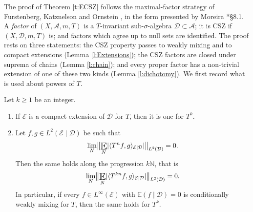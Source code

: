 The proof of Theorem \ref{t:ECSZ} follows the maximal-factor strategy of Furstenberg, Katznelson and Ornstein \cite{MR670131}, 
in the form presented by Moreira \cite{MoreiraNotes}*{\S 8.1}.  
A \emph{factor} of $(X,\mathcal A,m,T)$ is a $T$-invariant sub-$\sigma$-algebra $\mathcal D \subset \mathcal A$; it is CSZ if $(X,\mathcal D,m,T)$ is; 
and factors which agree up to null sets are identified.  
The proof rests on three statements: the CSZ property passes to weakly mixing and to compact extensions (Lemma \ref{l:Extensions}); 
the CSZ factors are closed under suprema of chains (Lemma \ref{l:chain}); and every proper factor has a non-trivial extension of one of these two kinds 
(Lemma \ref{l:dichotomy}).  We first record what is used about powers of $T$.  

\begin{lemma} \label{l:powers}
Let $k \geq 1$ be an integer.  
\begin{enumerate}
\item If $\mathcal E$ is a compact extension of $\mathcal D$ for $T$, then it is one for $T ^{k}$. 
\item Let $f,g \in L^2(\mathcal E\mid \mathcal D)$ be such that 
\begin{equation} \label{e:wmHypothesis}
\lim_{N} \bigl\lVert \Expectation_N \lvert \langle T ^{n}f,g \rangle _{\mathcal E \mid \mathcal D} \rvert \bigr\rVert _{L^2(\mathcal D)} =0 . 
\end{equation}
Then the same holds along the progression $k \mathbb N$, that is 
\begin{equation} \label{e:wmProgression}
\lim_{N} \bigl\lVert \Expectation_N \lvert \langle T ^{kn}f,g \rangle _{\mathcal E \mid \mathcal D} \rvert \bigr\rVert _{L^2(\mathcal D)} =0 . 
\end{equation}
In particular, if every $f \in L ^{\infty}(\mathcal E)$ with $\mathbb E(f\mid \mathcal D)=0$ is conditionally weakly mixing for $T$, 
then the same holds for $T ^{k}$. 
\end{enumerate}
\end{lemma}

